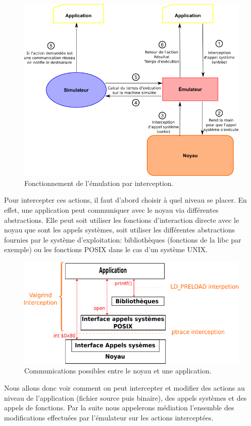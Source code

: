  \begin{figure}
   \centering \includegraphics[scale=0.5]{Pictures/png/Emulation_fonctionnement}
   \caption{Fonctionnement de l'émulation par interception.}
   \label{INTERCEPTION}
 \end{figure}
 
Pour intercepter ces actions, il faut d'abord choisir à quel niveau se placer.
En effet, une application peut communiquer avec le noyau via différentes
abstractions. Elle peut soit utiliser les fonctions d'interaction directe avec
le noyau que sont les appels systèmes, soit utiliser les différentes
abstractions fournies par le système d'exploitation: bibliothèques (fonctions de
la libc par exemple) ou les fonctions POSIX dans le cas d'un système UNIX.

\begin{figure}[H]
 \centering
 \includegraphics[scale=0.75]{Pictures/png/Communication_application_noyau_v3.png}
 \caption{Communications possibles entre le noyau et une application.}
 \label{AS_Communication}
\end{figure}

Nous allons donc voir comment on peut intercepter et modifier des actions au
niveau de l'application (fichier source puis binaire), des appels systèmes et
des appels de fonctions. Par la suite nous appelerons médiation l'ensemble des
modifications effectuées par l'émulateur sur les actions interceptées.

